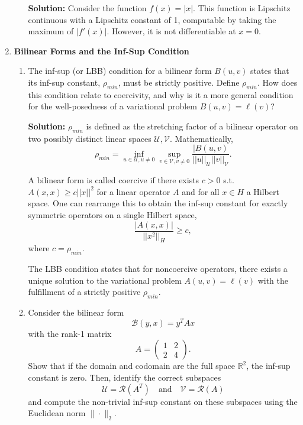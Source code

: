\documentclass{article}
\theoremstyle{definition}
\theoremstyle{remark}
\begin{document}
\begin{enumerate}
\begin{enumerate}
        \textbf{Solution:} Consider the function \(f(x) = |x|\). This function is Lipschitz continuous with a Lipschitz constant of 1, computable by taking the maximum of \(|f'(x)|\). However, it is not differentiable at \(x=0\).
        
    \end{enumerate}
    \item \textbf{Bilinear Forms and the Inf-Sup Condition}
    \begin{enumerate}
        \item  The inf-sup (or LBB) condition for a bilinear form $B(u,v)$ states that its inf-sup constant, $\rho_{min}$, must be strictly positive. Define $\rho_{min}$. How does this condition relate to coercivity, and why is it a more general condition for the well-posedness of a variational problem $B(u,v) = \ell(v)$?

        \textbf{Solution:} \(\rho_{min}\) is defined as the stretching factor of a bilinear operator on two possibly distinct linear spaces \(\mathcal{U}, \mathcal{V}\). Mathematically,
        \[
            \rho_{min} = \inf_{u\in \mathcal{U}, u \not = 0} \sup_{v\in \mathcal{V}, v \not = 0} \frac{|B(u,v)}{||u||_{\mathcal{U}}||v||_{\mathcal{V}}}
        .\]

        A bilinear form is called coercive if there exists \(c>0\) s.t. \(A(x,x)\geq c||x||^{2}\) for a linear operator \(A\) and for all \(x\in H\) a Hilbert space. One can rearrange this to obtain the inf-sup constant for exactly symmetric operators on a single Hilbert space,
        \[
            \frac{|A(x,x)|}{||x^{2}||_{H}} \geq c
        ,\]
        where \(c=\rho_{min}\).

        The LBB condition states that for noncoercive operators, there exists a unique solution to the variational problem \(A(u,v) = \ell(v)\) with the fulfillment of a strictly positive \(\rho_{min}\).\\

        \item Consider the bilinear form 
            \[
                \mathcal{B}(y,x) = y^{T}Ax
            \]
        with the rank-1 matrix 
            \[
                A = \begin{pmatrix} 
                1 & 2 \\ 
                2 & 4 
                \end{pmatrix}.
            \]
        Show that if the domain and codomain are the full space $\mathbb{R}^{2}$, the inf-sup constant is zero. Then, identify the correct subspaces 
            \[
                \mathcal{U} = \mathcal{R}(A^{T}) \quad \text{and} \quad \mathcal{V} = \mathcal{R}(A)
            \]
        and compute the non-trivial inf-sup constant on these subspaces using the Euclidean norm $\|\cdot\|_{2}$.


\end{enumerate}
\end{enumerate}
\end{document}
